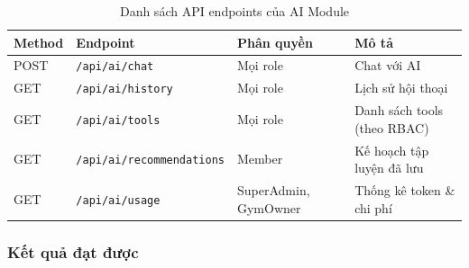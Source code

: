 \begin{table}[H]
\centering
\renewcommand{\arraystretch}{1.35}
\begin{tabular}{|l|l|l|l|}
\hline
\textbf{Method} & \textbf{Endpoint} & \textbf{Phân quyền} & \textbf{Mô tả} \\
\hline
POST & \texttt{/api/ai/chat} & Mọi role & Chat với AI \\
\hline
GET  & \texttt{/api/ai/history} & Mọi role & Lịch sử hội thoại \\
\hline
GET  & \texttt{/api/ai/tools} & Mọi role & Danh sách tools (theo RBAC) \\
\hline
GET  & \texttt{/api/ai/recommendations} & Member & Kế hoạch tập luyện đã lưu \\
\hline
GET  & \texttt{/api/ai/usage} & SuperAdmin, GymOwner & Thống kê token \& chi phí \\
\hline
\end{tabular}
\caption{Danh sách API endpoints của AI Module}
\label{tab:ai-endpoints}
\end{table}

\subsubsection{Kết quả đạt được}

